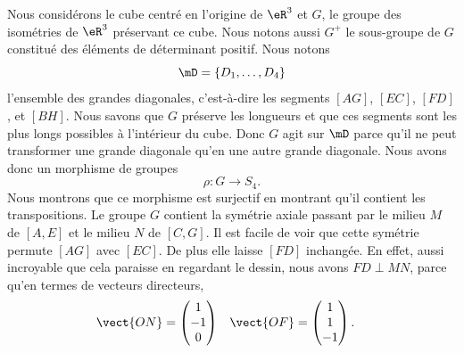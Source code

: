 \begin{figure}
	\vspace{-0.5cm}        %
	\centering
	
\end{figure}
Nous considérons le cube centré en l'origine de \( \eR^3\) et \( G\), le groupe des isométries de \( \eR^3\) préservant ce cube. Nous notons aussi \( G^+\) le sous-groupe de \( G\) constitué des éléments de déterminant positif. Nous notons
\begin{equation}
	\mD=\{ D_1,\ldots, D_4 \}
\end{equation}
l'ensemble des grandes diagonales, c'est-à-dire les segments \( [AG]\), \( [EC]\), \( [FD]\), et \( [BH]\). Nous savons que \( G\) préserve les longueurs et que ces segments sont les plus longs possibles à l'intérieur du cube. Donc \( G\) agit sur \( \mD\) parce qu'il ne peut transformer une grande diagonale qu'en une autre grande diagonale. Nous avons donc un morphisme de groupes
\begin{equation}
	\rho\colon G\to S_4.
\end{equation}
Nous montrons que ce morphisme est surjectif en montrant qu'il contient les transpositions. Le groupe \( G\) contient la symétrie axiale passant par le milieu \( M\) de \( [A,E]\) et le milieu \( N\) de \( [C,G]\). Il est facile de voir que cette symétrie permute \( [AG]\) avec \( [EC]\). De plus elle laisse \( [FD]\) inchangée. En effet, aussi incroyable que cela paraisse en regardant le dessin, nous avons \( FD\perp MN\), parce qu'en termes de vecteurs directeurs,
\begin{equation}
	\begin{aligned}[]
		\vect{ ON } & =\begin{pmatrix}
			               1  \\
			               -1 \\
			               0
		               \end{pmatrix} & \vect{ OF } & =\begin{pmatrix}
			                                              1 \\
			                                              1 \\
			                                              -1
		                                              \end{pmatrix}.
	\end{aligned}
\end{equation}


